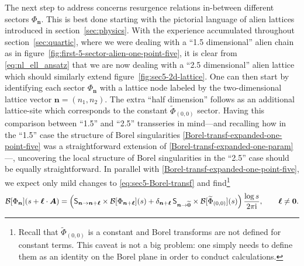 \documentclass[11pt,a4paper]{article}
\newcommand{\CB}{{\cal B}}
\newcommand{\be}{\begin{equation}}
\newcommand{\ee}{\end{equation}}
\newcommand{\rmi}{{\mathrm{i}}}
\begin{document}
The next step to address concerns resurgence relations in-between different sectors $\Phi_{\boldsymbol{n}}$. This is best done starting with the pictorial language of alien lattices introduced in section~\ref{sec:physics}. With the experience accumulated throughout section~\ref{sec:quartic}, where we were dealing with a ``1.5 dimensional'' alien chain as in figure~\ref{fig:first-5-sector-alien-one-point-five}, it is clear from \eqref{eq:nl_ell_ansatz} that we are now dealing with a ``2.5 dimensional'' alien lattice which should similarly extend figure~\ref{fig:sec5-2d-lattice}. One can then start by identifying each sector $\Phi_{\boldsymbol{n}}$ with a lattice node labeled by the two-dimensional lattice vector $\boldsymbol{n} = (n_1,n_2)$. The extra ``half dimension'' follows as an additional lattice-site which corresponds to the constant $\widetilde{\Phi}_{(0,0)}$ sector. Having this comparison between ``1.5'' and ``2.5'' transseries in mind---and recalling how in the ``1.5'' case the structure of Borel singularities \eqref{Borel-transf-expanded-one-point-five} was a straightforward extension of \eqref{Borel-transf-expanded-one-param}---, uncovering the local structure of Borel singularities in the ``2.5'' case should be equally straightforward. In parallel with \eqref{Borel-transf-expanded-one-point-five}, we expect only mild changes to \eqref{eq:sec5-Borel-transf} and find\footnote{Recall that $\widetilde{\Phi}_{(0,0)}$ is a constant and Borel transforms are not defined for constant terms. This caveat is not a big problem: one simply needs to define them as an identity on the Borel plane in order to conduct calculations.}
%
\be
\label{eq:elliptic-bridge-borel}
\CB [\Phi_{\boldsymbol{n}}] ( s + \boldsymbol{\ell} \cdot \boldsymbol{A} ) = \left( \mathsf{S}_{\boldsymbol{n} \to \boldsymbol{n}+\boldsymbol{\ell}} \times \CB [ \Phi_{\boldsymbol{n}+\boldsymbol{\ell}} ] (s) + \delta_{\boldsymbol{n}+\boldsymbol{\ell}}\, \mathsf{S}_{\boldsymbol{n} \to \widetilde{\boldsymbol{0}}} \times \CB [\widetilde{\Phi}_{(0,0)}] (s) \right) \frac{\log s}{2\pi\rmi}, \qquad \boldsymbol{\ell} \neq \boldsymbol{0}.
\ee
\end{document}
